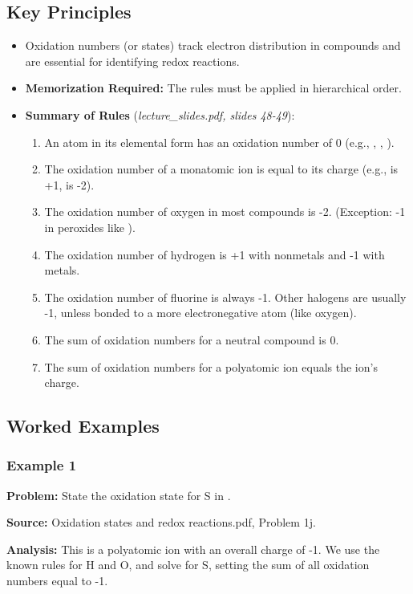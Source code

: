 \documentclass{article}
\begin{document}
\subsection{Key Principles}
\begin{itemize}
    \item Oxidation numbers (or states) track electron distribution in compounds and are essential for identifying redox reactions.
    \item \textbf{Memorization Required:} The rules must be applied in hierarchical order.
    \item \textbf{Summary of Rules} (\textit{lecture\_slides.pdf, slides 48-49}):
        \begin{enumerate}
            \item An atom in its elemental form has an oxidation number of 0 (e.g., , , ).
            \item The oxidation number of a monatomic ion is equal to its charge (e.g.,  is +1,  is -2).
            \item The oxidation number of oxygen in most compounds is -2. (Exception: -1 in peroxides like ).
            \item The oxidation number of hydrogen is +1 with nonmetals and -1 with metals.
            \item The oxidation number of fluorine is always -1. Other halogens are usually -1, unless bonded to a more electronegative atom (like oxygen).
            \item The sum of oxidation numbers for a neutral compound is 0.
            \item The sum of oxidation numbers for a polyatomic ion equals the ion's charge.
        \end{enumerate}
\end{itemize}

\subsection{Worked Examples}
\subsubsection{Example 1}
\textbf{Problem:} State the oxidation state for S in .

\textbf{Source:} Oxidation states and redox reactions.pdf, Problem 1j.

\textbf{Analysis:} This is a polyatomic ion with an overall charge of -1. We use the known rules for H and O, and solve for S, setting the sum of all oxidation numbers equal to -1.
\end{document}

